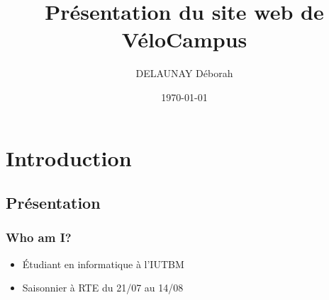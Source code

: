 \documentclass[12pt]{beamer}
\title{Présentation du site web de VéloCampus}
\author{DELAUNAY Déborah}
\institute{IUTBM - VéloCampus}
\date{\today}
\begin{document}
\begin{frame}
	\titlepage{}
\end{frame}


\section{Introduction}
\subsection{Présentation}
\begin{frame}
	\frametitle{Who am I?}
	\begin{itemize}[<+->]
		\onslide
			\item Étudiant en informatique à l'IUTBM
		\onslide		
			\item Saisonnier à RTE du 21/07 au 14/08
	\end{itemize}
\end{frame}
\end{document}
